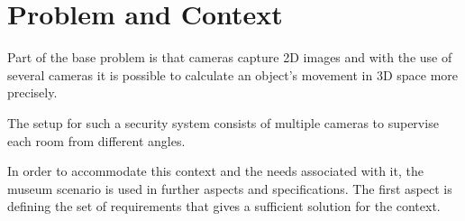 \section{Problem and Context}\label{sec:prob_cont}


Part of the base problem is that cameras capture 2D images and with the use of several cameras it is possible to calculate an object's movement in 3D space more precisely. 

The setup for such a security system consists of multiple cameras to supervise each room from different angles. 


In order to accommodate this context and the needs associated with it, the museum scenario is used in further aspects and specifications. The first aspect is defining the set of requirements that gives a sufficient solution for the context. 

